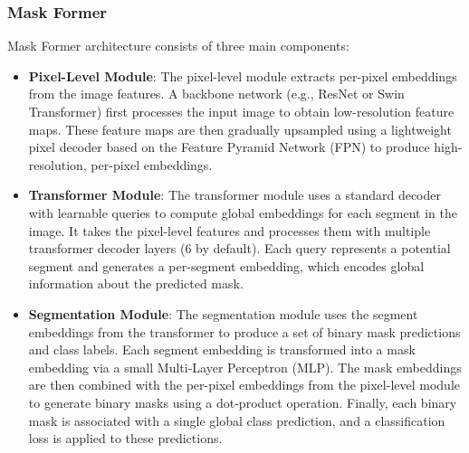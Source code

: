 \subsubsection{Mask Former}
Mask Former \cite{cheng2021perpixelclassificationneedsemantic} architecture consists of three main components:
\begin{itemize}
    \item \textbf{Pixel-Level Module}: The pixel-level module extracts per-pixel embeddings from the image features. A backbone network (e.g., ResNet or Swin Transformer) first processes the input image to obtain low-resolution feature maps. These feature maps are then gradually upsampled using a lightweight pixel decoder based on the Feature Pyramid Network (FPN) to produce high-resolution, per-pixel embeddings.
    \item \textbf{Transformer Module}: The transformer module uses a standard decoder with learnable queries to compute global embeddings for each segment in the image. It takes the pixel-level features and processes them with multiple transformer decoder layers (6 by default). Each query represents a potential segment and generates a per-segment embedding, which encodes global information about the predicted mask.
    \item \textbf{Segmentation Module}: The segmentation module uses the segment embeddings from the transformer to produce a set of binary mask predictions and class labels. Each segment embedding is transformed into a mask embedding via a small Multi-Layer Perceptron (MLP). The mask embeddings are then combined with the per-pixel embeddings from the pixel-level module to generate binary masks using a dot-product operation. Finally, each binary mask is associated with a single global class prediction, and a classification loss is applied to these predictions. 
\end{itemize}

